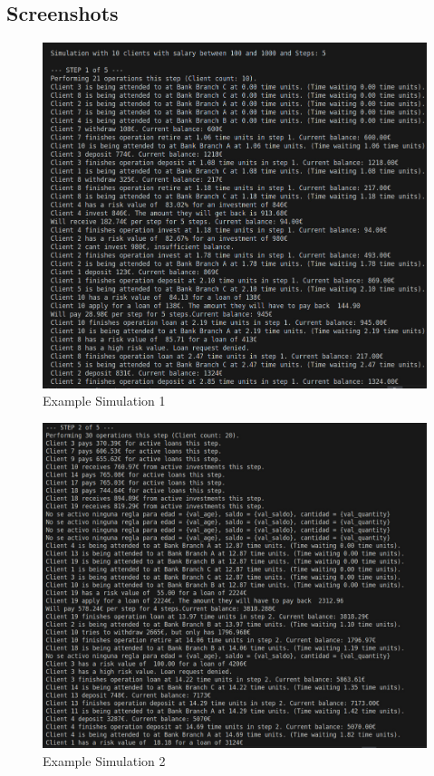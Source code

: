\documentclass[titlepage, 12pt]{article}
\begin{document}
\newpage

\subsection{Screenshots}

\begin{figure} [h]
    \centering
    \includegraphics[scale=0.4]{Screenshots/Example Simulation1.jpeg}
    \caption{Example Simulation 1}
    \label{fig:Example Simulation1}
\end{figure}

\begin{figure} [h]
    \centering
    \includegraphics[scale=0.4]{Screenshots/Example Simulation2.jpeg}
    \caption{Example Simulation 2}
    \label{fig:Example Simulation2}
\end{figure}
\end{document}
